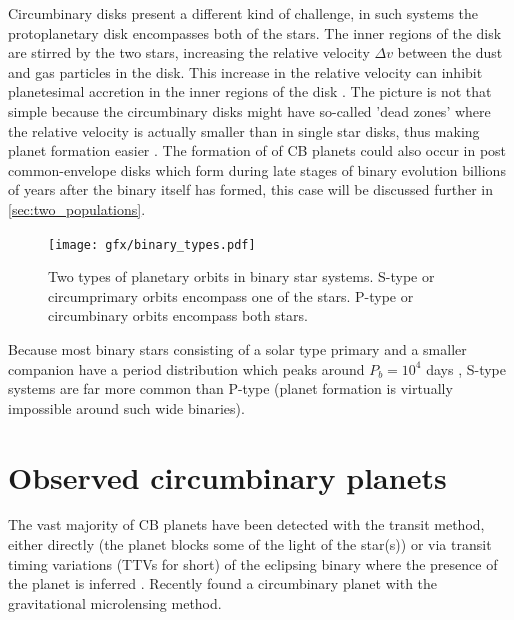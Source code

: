 \documentclass[twoside,openright,titlepage,numbers=noenddot,headinclude,%
                footinclude=true,cleardoublepage=empty,abstractoff, 
                BCOR=5mm,paper=a4,fontsize=11pt,%
                american,%
                ]{scrreprt}%
\begin{document}
 
 Circumbinary
 disks present a different kind of challenge, in such systems the protoplanetary
 disk encompasses both of the stars. The inner regions of the disk are 
 stirred by the two stars, increasing the relative velocity $\Delta v$ between
 the dust and gas particles in the disk. This increase in the relative velocity
 can inhibit planetesimal accretion in the inner regions of the disk
 \citep{meschiari2012}. The picture is not that simple because the 
 circumbinary disks might have so-called 'dead zones' where the relative
 velocity is actually smaller than in single star disks, thus making planet
 formation easier \citep{rafikov2013, martin2013}. 
The formation of of CB planets could also occur in post 
 common-envelope disks which form during late stages of binary evolution 
 billions of years after the binary itself has formed, this case will be 
 discussed further in \cref{sec:two_populations}.
\begin{figure}[htb]
\centering
\texttt{[image: gfx/binary\_types.pdf]}
    \caption[Types of orbits in binaries.]{Two types of planetary 
    orbits in binary star systems. S-type or
    circumprimary orbits encompass one of the stars. P-type or circumbinary
    orbits encompass both stars.}
\label{fig:binary_types}
\end{figure}

Because most binary stars consisting of a solar 
 type primary and a smaller
companion have a period distribution which peaks around $P_b=10^4$ days 
\citep{mayor1991}, S-type systems are far more common than P-type (planet 
formation is virtually impossible around such wide binaries).

\section{Observed circumbinary planets}
\label{sec:Observed circumbinary planets}
The vast majority of CB planets have been detected with
the transit method, either directly (the planet blocks some of the 
light of the star(s)) or via transit timing variations (TTVs for short)
of the eclipsing binary 
where the presence of the planet is inferred 
\citep[see][for explaination of exoplanet detection methods]{perryman}.
Recently \citet{microlensing_cb} found a circumbinary planet with the
gravitational microlensing method.
\end{document}
